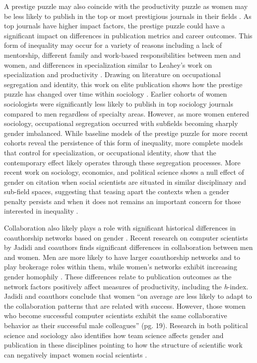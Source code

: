 \documentclass[
  10pt,
  letterpaper,
]{article}
\begin{document}
A prestige puzzle may also coincide with the productivity puzzle as
women may be less likely to publish in the top or most prestigious
journals in their fields \citep{light_gender_2013}. As top journals have
higher impact factors, the prestige puzzle could have a significant
impact on differences in publication metrics and career outcomes. This
form of inequality may occur for a variety of reasons including a lack
of mentorship, different family and work-based responsibilities between
men and women, and differences in specialization similar to Leahey's
work on specialization and productivity
\citep{leahey_gender_2006, leahey_not_2007, light_gender_2009}. Drawing
on literature on occupational segregation and identity, this work on
elite publication shows how the prestige puzzle has changed over time
within sociology \citep{light_gender_2009}. Earlier cohorts of women
sociologists were significantly less likely to publish in top sociology
journals compared to men regardless of specialty areas. However, as more
women entered sociology, occupational segregation occurred with
subfields becoming sharply gender imbalanced. While baseline models of
the prestige puzzle for more recent cohorts reveal the persistence of
this form of inequality, more complete models that control for
specialization, or occupational identity, show that the contemporary
effect likely operates through these segregation processes. More recent
work on sociology, economics, and political science shows a null effect
of gender on citation when social scientists are situated in similar
disciplinary and sub-field spaces, suggesting that teasing apart the
contexts when a gender penalty persists and when it does not remains an
important concern for those interested in inequality
\citep{lynn_rare_2019}.

Collaboration also likely plays a role with significant historical
differences in coauthorship networks based on gender
\citep{moody_structure_2004}. Recent research on computer scientists by
Jadidi and coauthors finds significant differences in collaboration
between men and women. Men are more likely to have larger coauthorship
networks and to play brokerage roles within them, while women's networks
exhibit increasing gender homophily \citep{jadidi_gender_2018}. These
differences relate to publication outcomes as the network factors
positively affect measures of productivity, including the
\emph{h}-index. Jadidi and coauthors conclude that women ``on average
are less likely to adapt to the collaboration patterns that are related
with success. However, those women who become successful computer
scientists exhibit the same collaborative behavior as their successful
male colleagues'' (pg. 19). Research in both political science and
sociology also identifies how team science affects gender and
publication in these disciplines pointing to how the structure of
scientific work can negatively impact women social scientists
\citep{akbaritabar_gender_2021, teele_gender_2017}.
\end{document}
